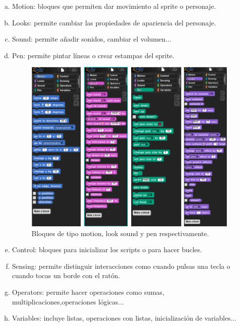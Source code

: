 \documentclass[a4paper, 12pt]{book}
\begin{document}
\begin{itemize}
\begin{enumerate}[1)]
            \begin{enumerate}[a)]
                \item Motion: bloques que permiten dar movimiento al sprite o personaje.
                \item Looks: permite cambiar las propiedades de apariencia del personaje.
                \item Sound: permite añadir sonidos, cambiar el volumen...
                \item Pen: permite pintar líneas o crear estampas del sprite.
                \\
                    \begin{figure}[h]
                        \centering
                        \includegraphics[scale=0.45]{img/4-blocks.png}
                        \caption{Bloques de tipo motion, look sound y pen respectivamente.}
                        \label{figura:bloque1}
                    \end{figure}
                \item Control: bloques para inicializar los scripts o para hacer bucles.
                \item Sensing: permite distinguir interacciones como cuando pulsas una tecla o cuando tocas un borde con el ratón.
                \item Operators: permite hacer operaciones como sumas, multiplicaciones,operaciones lógicas...
                \item Variables: incluye listas, operaciones con listas, inicialización de variables...

\end{enumerate}
\end{enumerate}
\end{itemize}
\end{document}
